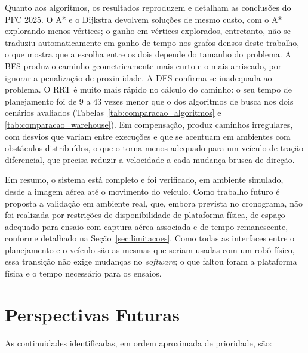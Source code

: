 \documentclass[
    12pt,
    openright,
    oneside,
    a4paper,
    english,
    brazil
]{abntex2}
\begin{document}
Quanto aos algoritmos, os resultados reproduzem e detalham as conclusões do PFC 2025. O A* e o Dijkstra devolvem soluções de mesmo custo, com o A* explorando menos vértices; o ganho em vértices explorados, entretanto, não se traduziu automaticamente em ganho de tempo nos grafos densos deste trabalho, o que mostra que a escolha entre os dois depende do tamanho do problema. A BFS produz o caminho geometricamente mais curto e o mais arriscado, por ignorar a penalização de proximidade. A DFS confirma-se inadequada ao problema. O RRT é muito mais rápido no cálculo do caminho: o seu tempo de planejamento foi de 9 a 43 vezes menor que o dos algoritmos de busca nos dois cenários avaliados (Tabelas~\ref{tab:comparacao_algoritmos} e \ref{tab:comparacao_warehouse}). Em compensação, produz caminhos irregulares, com desvios que variam entre execuções e que se acentuam em ambientes com obstáculos distribuídos, o que o torna menos adequado para um veículo de tração diferencial, que precisa reduzir a velocidade a cada mudança brusca de direção.

Em resumo, o sistema está completo e foi verificado, em ambiente simulado, desde a imagem aérea até o movimento do veículo. Como trabalho futuro é proposta a validação em ambiente real, que, embora prevista no cronograma, não foi realizada por restrições de disponibilidade de plataforma física, de espaço adequado para ensaio com captura aérea associada e de tempo remanescente, conforme detalhado na Seção~\ref{sec:limitacoes}. Como todas as interfaces entre o planejamento e o veículo são as mesmas que seriam usadas com um robô físico, essa transição não exige mudanças no \textit{software}; o que faltou foram a plataforma física e o tempo necessário para os ensaios.

\section{Perspectivas Futuras}
\label{sec:perspectivas}

As continuidades identificadas, em ordem aproximada de prioridade, são:
\end{document}
